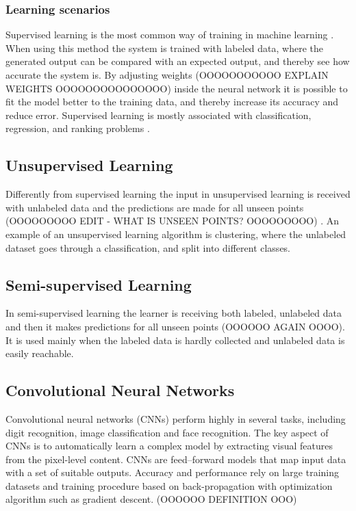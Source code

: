 \subsubsection{Learning scenarios}
Supervised learning is the most common way of training in machine learning \citep{LeCun2015}. When using this method the system is trained with labeled data, where the generated output can be compared with an expected output, and thereby see how accurate the system is. By adjusting weights (OOOOOOOOOOO EXPLAIN WEIGHTS OOOOOOOOOOOOOOO) inside the neural network it is possible to fit the model better to the training data, and thereby increase its accuracy and reduce error.\citep{LeCun2015} Supervised learning is mostly associated with classification, regression, and ranking problems \citep{Mehryar2012}.

\subsection{Unsupervised Learning}
Differently from supervised learning the input in unsupervised learning is received with unlabeled data and the predictions are made for all unseen points (OOOOOOOOO EDIT - WHAT IS UNSEEN POINTS? OOOOOOOOO) \citep{Mehryar2012}. An example of an unsupervised learning algorithm is clustering, where the unlabeled dataset goes through a classification, and split into different classes.\citep{Goodfellow2016} 

\subsection{Semi-supervised Learning}
In semi-supervised learning the learner is receiving both labeled, unlabeled data and then it makes predictions for all unseen points (OOOOOO AGAIN OOOO). It is used mainly when the labeled data is hardly collected and unlabeled data is easily reachable. \citep{Mehryar2012}

\subsection{Convolutional Neural Networks}
Convolutional neural networks (CNNs) perform highly in several tasks, including digit recognition, image classification and face recognition. The key aspect of CNNs is to automatically learn a complex model by extracting visual features from the pixel-level content.
CNNs are feed–forward models that map input data with a set of suitable outputs. 
Accuracy and performance rely on large training datasets and training procedure based on back-propagation with optimization algorithm such as gradient descent. (OOOOOO DEFINITION OOO) \citep{Acquarelli2017}

